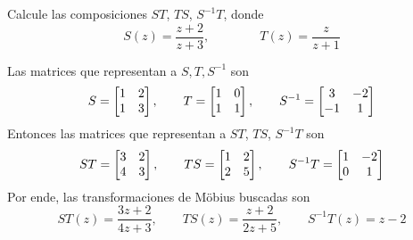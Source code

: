 \begin{exercise}
Calcule las composiciones $ST$, $TS$, $S^{-1} T$, donde
$$S(z) = \frac {z+2} {z+3}, \qquad \qquad T(z) = \frac z {z+1}$$
\end{exercise}

\begin{solution}
Las matrices que representan a $S, T, S^{-1}$ son
$$
S = \begin{bmatrix} 1 & 2 \\ 1 & 3 \end{bmatrix}, \qquad
T = \begin{bmatrix} 1 & 0 \\ 1 & 1 \end{bmatrix}, \qquad
S^{-1} = \begin{bmatrix} 3 & -2 \\ -1 & 1 \end{bmatrix}
$$
Entonces las matrices que representan a $ST$, $TS$, $S^{-1} T$ son
$$
ST = \begin{bmatrix} 3 & 2 \\ 4 & 3 \end{bmatrix}, \qquad
TS = \begin{bmatrix} 1 & 2 \\ 2 & 5 \end{bmatrix}, \qquad
S^{-1} T = \begin{bmatrix} 1 & -2 \\ 0 & 1 \end{bmatrix}
$$
Por ende, las transformaciones de Möbius buscadas son
$$
ST(z) = \frac {3z + 2} {4z + 3}, \qquad
TS(z) = \frac {z + 2} {2z + 5}, \qquad
S^{-1} T(z) = z - 2
$$
\end{solution}

